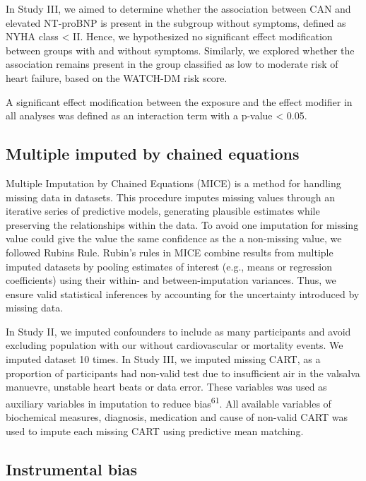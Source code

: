 \documentclass[
  a4paper,
  headsepline=true,
  open=any]{scrbook}
\begin{document}
In Study III, we aimed to determine whether the association between CAN
and elevated NT-proBNP is present in the subgroup without symptoms,
defined as NYHA class \textless{} II. Hence, we hypothesized no
significant effect modification between groups with and without
symptoms. Similarly, we explored whether the association remains present
in the group classified as low to moderate risk of heart failure, based
on the WATCH-DM risk score.

A significant effect modification between the exposure and the effect
modifier in all analyses was defined as an interaction term with a
p-value \textless{} 0.05.

\hypertarget{multiple-imputed-by-chained-equations}{%
\subsection{Multiple imputed by chained
equations}\label{multiple-imputed-by-chained-equations}}

Multiple Imputation by Chained Equations (MICE) is a method for handling
missing data in datasets. This procedure imputes missing values through
an iterative series of predictive models, generating plausible estimates
while preserving the relationships within the data. To avoid one
imputation for missing value could give the value the same confidence as
the a non-missing value, we followed Rubins Rule. Rubin's rules in MICE
combine results from multiple imputed datasets by pooling estimates of
interest (e.g., means or regression coefficients) using their within-
and between-imputation variances. Thus, we ensure valid statistical
inferences by accounting for the uncertainty introduced by missing data.

In Study II, we imputed confounders to include as many participants and
avoid excluding population with our without cardiovascular or mortality
events. We imputed dataset 10 times. In Study III, we imputed missing
CART, as a proportion of participants had non-valid test due to
insufficient air in the valsalva manuevre, unstable heart beats or data
error. These variables was used as auxiliary variables in imputation to
reduce bias\textsuperscript{61}. All available variables of biochemical
measures, diagnosis, medication and cause of non-valid CART was used to
impute each missing CART using predictive mean matching.

\hypertarget{instrumental-bias}{%
\subsection{Instrumental bias}\label{instrumental-bias}}
\end{document}

